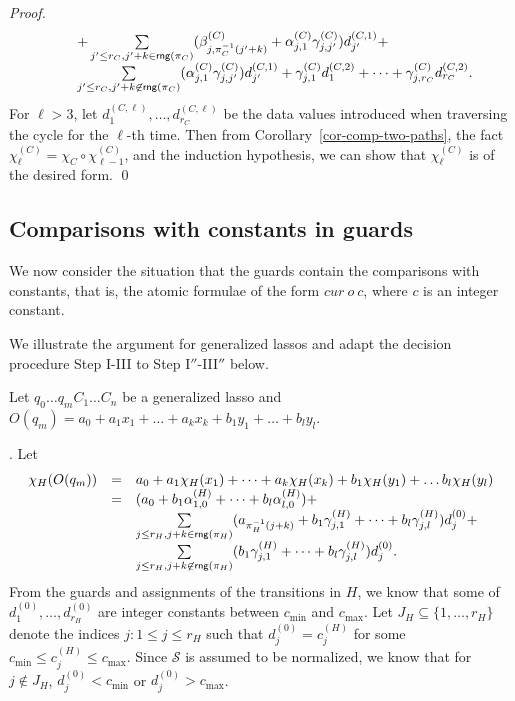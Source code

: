 \documentclass[runningheads,a4paper]{llncs}
\def\Ss{{\mathcal{S} }}
\newcommand\rng{\mathsf{rng}}
\begin{document}
\begin{appendix}
\begin{proof}
\[\begin{array}{l c l}
%
& & + \sum \limits_{j' \le r_C, j' + k \in \rng(\pi_C)} (\beta^{(C)}_{j,\pi_C^{-1}(j'+k)}+\alpha^{(C)}_{j,1} \gamma^{(C)}_{j,j'}) d^{(C,1)}_{j'} +\\
%
& & \sum \limits_{j' \le r_C, j' + k \not \in \rng(\pi_C)} (\alpha^{(C)}_{j,1} \gamma^{(C)}_{j,j'}) d^{(C,1)}_{j'} + 
 \gamma^{(C)}_{j,1} d^{(C,2)}_1 +\dots + \gamma^{(C)}_{j,r_C} d^{(C,2)}_{r_C}.
\end{array}
\] 
For $\ell > 3$, let $d^{(C,\ell)}_{1},\dots,d^{(C,\ell)}_{r_C}$ be the data values introduced when traversing the cycle for the $\ell$-th time. Then from Corollary~\ref{cor-comp-two-paths}, the fact $\chi^{(C)}_\ell = \chi_C \circ \chi^{(C)}_{\ell-1}$, and the induction hypothesis, we can show that $\chi^{(C)}_\ell$ is of the desired form.
\qed
\end{proof}





\subsection{Comparisons with constants in guards}

We now consider the situation that the guards contain the comparisons with constants, that is, the atomic formulae of the form $cur\ o\ c$, where $c$ is an integer constant. 

We illustrate the argument for generalized lassos and adapt the decision procedure Step I-III to Step I$''$-III$''$ below.

Let $q_0 \dots q_m C_1 \dots C_n$ be a generalized lasso and $O(q_m)=a_0 + a_1 x_1 + \dots + a_k x_k + b_1 y_1 + \dots + b_l y_l$.

\smallskip

. Let
\[
\begin{array}{l c l }
\chi_H(O(q_m)) & = & a_0 + a_1 \chi_H(x_1) + \dots + a_k \chi_H(x_k) + b_1 \chi_H(y_1) + \dots b_l \chi_H(y_l) \\
& = & (a_0+b_1 \alpha^{(H)}_{1,0} + \dots + b_l \alpha^{(H)}_{l,0}) + \\
& & \sum \limits_{j \le r_H, j+k \in \rng(\pi_H)} (a_{\pi_H^{-1}(j+k)}+ b_1 \gamma^{(H)}_{j,1}+\dots + b_l \gamma^{(H)}_{j,l}) d^{(0)}_j +
\\
& & \sum \limits_{j \le r_H, j +k \not \in \rng(\pi_H)}  (b_1 \gamma^{(H)}_{j,1}+\dots + b_l \gamma^{(H)}_{j,l}) d^{(0)}_j .
\end{array}
\]
From the guards and assignments of the transitions in $H$, we know that some of $d^{(0)}_1,\dots,d^{(0)}_{r_H}$ are integer constants between $c_{\min}$ and $c_{\max}$. Let $J_H \subseteq \{1,\dots, r_H\}$ denote the indices $j: 1 \le j \le r_H$ such that $d^{(0)}_j = c^{(H)}_j$ for some $c_{\min}\le c^{(H)}_j \le c_{\max}$. Since $\Ss$ is assumed to be normalized, we know that for $j \not \in J_H$,  $d^{(0)}_j < c_{\min}$ or $d^{(0)}_j > c_{\max}$.


\end{appendix}
\end{document}
